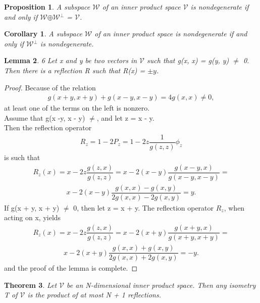 \documentclass[12pt,a4paper]{article}
\newtheorem{thm}{Theorem}
\newtheorem{lem}[thm]{Lemma}
\newtheorem{cor}[thm]{Corollary}
\newtheorem{prop}{Proposition}
\begin{document}
\begin{prop}
A subspace $\mathcal{W}$ of an inner product space $\mathcal{V}$ is nondegenerate if and only if $\mathcal{W}$$\oplus$$\mathcal{W}$$^\perp$ = $\mathcal{V}$.
\end{prop}

\begin{cor}
A subspace $\mathcal{W}$ of an inner product space is nondegenerate if and only if $\mathcal{W}$$^\perp$ is nondegenerate.
\end{cor}
\begin{lem}
6 Let x and y be two vectors in $\mathcal{V}$ such that g(x, x) =
g(y, y) $\ne$ 0. \\Then there is a reflection R such that R(x) = $\pm y$.
\end{lem}
\begin{proof}
Because of the relation
\begin{align*}
g(x + y, x + y) + g(x -y, x - y) = 4g(x, x) \ne 0,
\end{align*}
at least one of the terms on the left is nonzero. \\Assume that g(x -y, x - y) $\ne$, and let z = x - y. \\Then the reflection operator
\begin{align*}
R_z = 1 - 2P_z = 1 - 2z \dfrac{1}{g(z, z)} \phi_z
\end{align*}
is such that 
\begin{align*}
R_z(x) = x - 2z\dfrac{g(z,x)}{g(z,z)} = x - 2(x-y)\dfrac{g(x - y, x)}{g(x - y, x -y)}=
\end{align*}
\begin{align*}
x - 2(x-y)\dfrac{g(x,x) - g(x, y)}{2g(x,x) - 2g(x,y)} = y.
\end{align*}
If g(x + y, x + y) $\neq$ 0, then let z = x + y. The reflection operator $R_z$, when acting on x, yields
\begin{align*}
R_z(x) = x - 2z\dfrac{g(z,x)}{g(z,z)} = x - 2(x + y)\dfrac{g(x+y,x)}{g(x+y, x+y)}=
\end{align*}
\begin{align*}
 x - 2(x+y)\dfrac{g(x,x) + g(x,y)}{2g(x,x) + 2g(x,y)} = -y.
\end{align*}
and the proof of the lemma is complete. 
\end{proof}
\begin{thm}
Let $\mathcal{V}$ be an N-dimensional inner product space.
Then any isometry T of $\mathcal{V}$ is the product of at most N + 1 reflections.
\end{thm}
\end{document}
